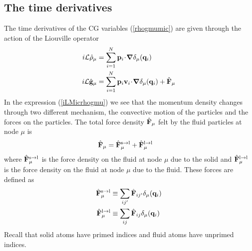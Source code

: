 \documentclass[b5paper,openright,11pt]{book}
\newcommand{\esc}{\!\cdot\!}
\begin{document}
\subsection{The time derivatives}
The time derivatives  of the CG variables  (\ref{rhogmumic}) are given
through the action of the Liouville operator
\begin{align}
i{\cal L}  \hat{\rho}_{\mu}&=\sum_{i=1}^N{\bf p}_i\esc\boldsymbol{\nabla}\delta_\mu({\bf q}_i)
\nonumber\\
i{\cal L}  \hat{\bf g}_{\mu}&=\sum_{i=1}^N{\bf p}_i{\bf v}_i\esc\boldsymbol{\nabla}\delta_\mu({\bf q}_i)
+\hat{\bf F}_\mu
\label{iLMicrhogmu}
\end{align}
In the expression (\ref{iLMicrhogmu}) we see that the momentum density
changes through two different mechanism,  the convective motion of the
particles and  the forces on  the particles.  The total  force density
$\hat{\bf F}_\mu$ felt by the fluid particles at node $\mu$ is
\begin{align}
\hat{\bf F}_\mu&=    \hat{\bf F}^{\rm s\to l}_\mu+  \hat{\bf F}^{\rm l\to l}_\mu
\end{align}
where $  \hat{\bf F}^{\rm  s\to l}_\mu$  is the  force density  on the
fluid  at node  $\mu$ due  to the  solid and  $ \hat{\bf  F}^{\rm l\to
  l}_\mu$ is the force  density on the fluid at node  $\mu$ due to the
fluid. These forces are defined as
\begin{align}
 \hat{\bf F}^{\rm s\to l}_\mu &\equiv\sum_{ij'}\hat{\bf F}_{ij'}\delta_\mu({\bf q}_i)
 \nonumber\\
 \hat{\bf F}^{\rm l\to l}_\mu &\equiv\sum_{ij}\hat{\bf F}_{ij}\delta_\mu({\bf q}_i)
\label{Fbin}
\end{align}
Recall that solid atoms have  primed indices and fluid atoms have unprimed indices.
\end{document}

